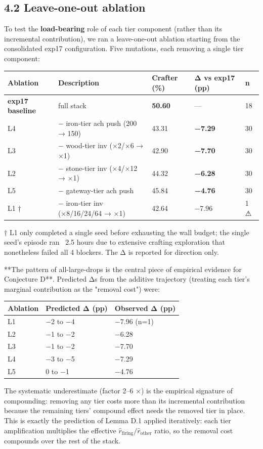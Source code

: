\subsection{4.2 Leave-one-out ablation}

To test the \textbf{load-bearing} role of each tier component (rather than
its incremental contribution), we ran a leave-one-out ablation
starting from the consolidated exp17 configuration. Five mutations,
each removing a single tier component:

\begin{tabular}{l l l l l}
\toprule
Ablation & Description & Crafter (\%) & Δ vs exp17 (pp) & n \\
\midrule
\textbf{exp17 baseline} & full stack & \textbf{50.60} & — & 18 \\
L4 & − iron-tier ach push (200 → 150) & 43.31 & \textbf{−7.29} & 30 \\
L3 & − wood-tier inv (×2/×6 → ×1) & 42.90 & \textbf{−7.70} & 30 \\
L2 & − stone-tier inv (×4/×12 → ×1) & 44.32 & \textbf{−6.28} & 30 \\
L5 & − gateway-tier ach push & 45.84 & \textbf{−4.76} & 30 \\
L1 † & − iron-tier inv (×8/16/24/64 → ×1) & 42.64 & −7.96 & 1 ⚠ \\
\bottomrule
\end{tabular}

† L1 only completed a single seed before exhausting the wall budget;
the single seed's episode ran ~2.5 hours due to extensive crafting
exploration that nonetheless failed all 4 blockers. The Δ is reported
for direction only.

**The pattern of all-large-drops is the central piece of empirical
evidence for Conjecture D**. Predicted Δs from the additive trajectory
(treating each tier's marginal contribution as the "removal cost")
were:

\begin{tabular}{l l l}
\toprule
Ablation & Predicted Δ (pp) & Observed Δ (pp) \\
\midrule
L1 & −2 to −4 & −7.96 (n=1) \\
L2 & −1 to −2 & −6.28 \\
L3 & −1 to −2 & −7.70 \\
L4 & −3 to −5 & −7.29 \\
L5 & 0 to −1 & −4.76 \\
\bottomrule
\end{tabular}

The systematic underestimate (factor 2–6 ×) is the empirical signature
of compounding: removing any tier costs more than its incremental
contribution because the remaining tiers' compound effect needs the
removed tier in place. This is exactly the prediction of Lemma D.1
applied iteratively: each tier amplification multiplies the effective
$\widehat{r}_{\text{firing}}/\widehat{r}_{\text{other}}$ ratio, so the
removal cost compounds over the rest of the stack.

